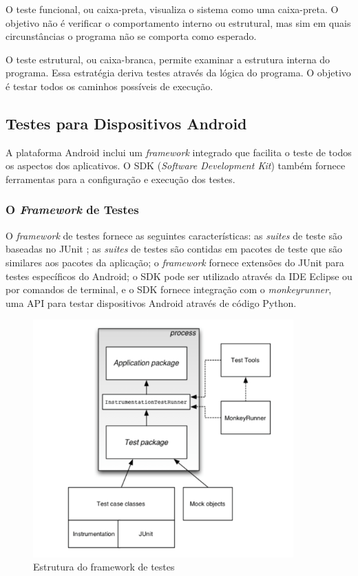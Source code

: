 O teste funcional, ou caixa-preta, visualiza o sistema como uma caixa-preta. O objetivo não é verificar o comportamento interno ou estrutural, mas sim em quais circunstâncias o programa não se comporta como esperado\cite{myers2011}.

O teste estrutural, ou caixa-branca, permite examinar a estrutura interna do programa. Essa estratégia deriva testes através da lógica do programa. O objetivo é testar todos os caminhos possíveis de execução\cite{myers2011}.

  \subsection{Testes para Dispositivos Android}

A plataforma Android inclui um \textit{framework} integrado que facilita o teste de todos os aspectos dos aplicativos. O SDK (\textit{Software Development Kit}) também fornece ferramentas para a configuração e execução dos testes.

    \subsubsection{O \textit{Framework} de Testes}

O \textit{framework} de testes fornece as seguintes características: as \textit{suites} de teste são baseadas no JUnit \cite{junit2015}; as \textit{suites} de testes são contidas em pacotes de teste que são similares aos pacotes da aplicação; o \textit{framework} fornece extensões do JUnit para testes específicos do Android; o SDK pode ser utilizado através da IDE Eclipse ou por comandos de terminal, e o SDK fornece integração com o \textit{monkeyrunner}, uma API para testar dispositivos Android através de código Python.

\begin{figure}[H]
  \centering
  \includegraphics[width=10cm]{figuras/android_test.png}
  \caption{Estrutura do framework de testes \cite{androidTesting2015}}
  \label{figura:testes}
\end{figure}

